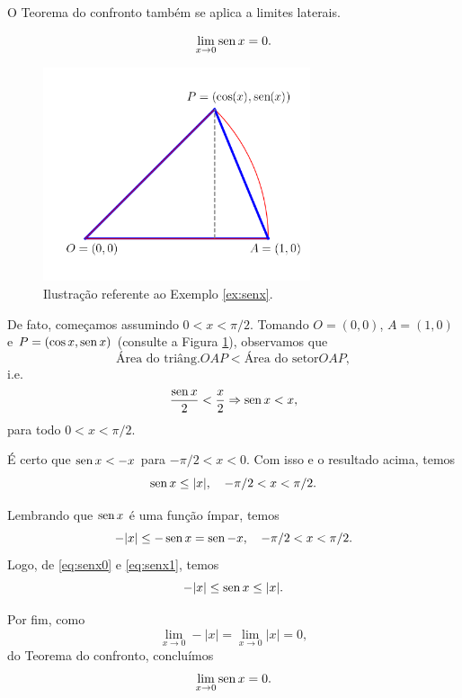 \begin{obs}
  O Teorema do confronto também se aplica a limites laterais.
\end{obs}

\begin{ex}\label{ex:senx}
  \begin{equation}
    \lim_{x\to 0} \operatorname{sen} x = 0.
  \end{equation}

  \begin{figure}[H]
    \centering
    \includegraphics[width=0.7\textwidth]{./cap_lim/dados/figLimSenx/fig}
    \caption{Ilustração referente ao Exemplo \ref{ex:senx}.}
    \label{fig:limSenx}
  \end{figure}
  
  De fato, começamos assumindo $0<x<\pi/2$. Tomando $O = (0,0)$, $A=(1,0)$ e $P = (\cos x, \operatorname{sen} x)$ (consulte a Figura \ref{fig:limSenx}), observamos que
  \begin{equation}
    \text{Área do triâng.} OAP < \text{Área do setor} OAP,
  \end{equation}
  i.e.
  \begin{equation}
    \frac{\operatorname{sen} x}{2} < \frac{x}{2} \Rightarrow \operatorname{sen} x < x,
  \end{equation}
  para todo $0< x < \pi/2$. 

  É certo que $\operatorname{sen} x < -x$ para $-\pi/2 < x < 0$. Com isso e o resultado acima, temos
  \begin{equation}\label{eq:senx0}
    \operatorname{sen} x \leq |x|,\quad -\pi/2 < x < \pi/2.
  \end{equation}

  Lembrando que $\operatorname{sen} x$ é uma função ímpar, temos
  \begin{equation}\label{eq:senx1}
    -|x| \leq -\operatorname{sen} x = \operatorname{sen} -x,\quad -\pi/2 < x < \pi/2.
  \end{equation}
  Logo, de \eqref{eq:senx0} e \eqref{eq:senx1}, temos
  \begin{equation}
    -|x| \leq \operatorname{sen} x \leq |x|.
  \end{equation}

  Por fim, como
  \begin{equation}
    \lim_{x\to 0} -|x| = \lim_{x\to 0} |x| = 0,
  \end{equation}
  do Teorema do confronto, concluímos
  \begin{equation}
    \lim_{x\to 0} \operatorname{sen} x = 0.
  \end{equation}
\end{ex}

